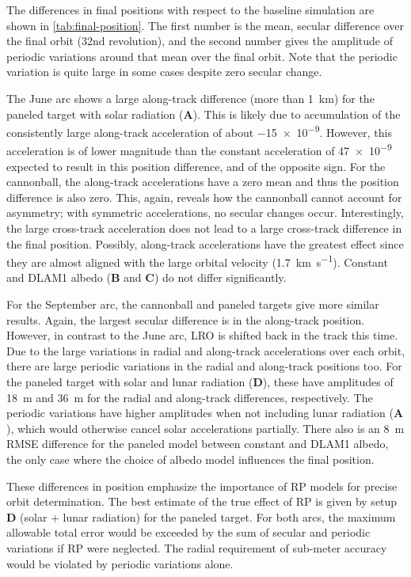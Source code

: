 The differences in final positions with respect to the baseline simulation are shown in \cref{tab:final-position}. The first number is the mean, secular difference over the final orbit (32nd revolution), and the second number gives the amplitude of periodic variations around that mean over the final orbit. Note that the periodic variation is quite large in some cases despite zero secular change.

The June arc shows a large along-track difference (more than \qty{1}{\km}) for the paneled target with solar radiation ($\mathbf{A}$). This is likely due to accumulation of the consistently large along-track acceleration of about \qty{-15e-9}{\acc}. However, this acceleration is of lower magnitude than the constant acceleration of \qty{+47e-9}{\acc} expected to result in this position difference, and of the opposite sign. For the cannonball, the along-track accelerations have a zero mean and thus the position difference is also zero. This, again, reveals how the cannonball cannot account for asymmetry; with symmetric accelerations, no secular changes occur. Interestingly, the large cross-track acceleration does not lead to a large cross-track difference in the final position. Possibly, along-track accelerations have the greatest effect since they are almost aligned with the large orbital velocity (\qty{1.7}{\km\per\s}). Constant and \gls{DLAM1} albedo ($\mathbf{B}$ and $\mathbf{C}$) do not differ significantly.

For the September arc, the cannonball and paneled targets give more similar results. Again, the largest secular difference is in the along-track position. However, in contrast to the June arc, \gls{LRO} is shifted back in the track this time. Due to the large variations in radial and along-track accelerations over each orbit, there are large periodic variations in the radial and along-track positions too. For the paneled target with solar and lunar radiation ($\mathbf{D}$), these have amplitudes of \qty{18}{\m} and \qty{36}{\m} for the radial and along-track differences, respectively. The periodic variations have higher amplitudes when not including lunar radiation ($\mathbf{A}$), which would otherwise cancel solar accelerations partially. There also is an \qty{8}{m} RMSE difference for the paneled model between constant and \gls{DLAM1} albedo, the only case where the choice of albedo model influences the final position.


These differences in position emphasize the importance of \gls{RP} models for precise orbit determination. The best estimate of the true effect of \gls{RP} is given by setup $\mathbf{D}$ (solar + lunar radiation) for the paneled target. For both arcs, the maximum allowable total error would be exceeded by the sum of secular and periodic variations if \gls{RP} were neglected. The radial requirement of sub-meter accuracy would be violated by periodic variations alone.




